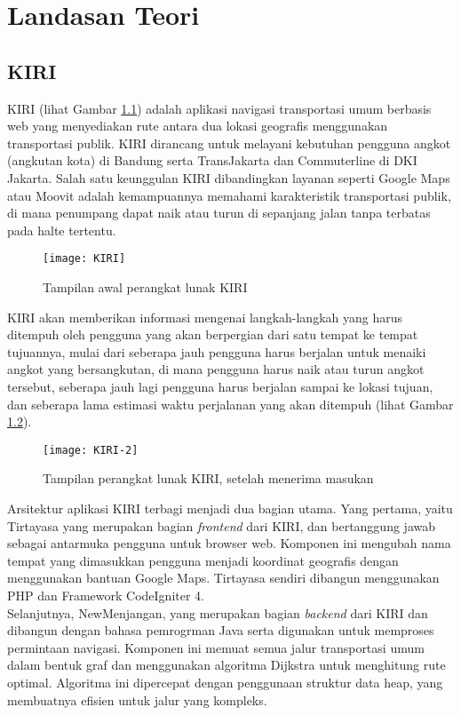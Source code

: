 \chapter{Landasan Teori}
\label{chap:teori}

\section{KIRI ~\cite{nugroho_natali:17:KIRI}}
\label{sec:kiri}
KIRI (lihat Gambar \ref{fig:tampilanawalkiri}) adalah aplikasi navigasi transportasi umum berbasis web yang menyediakan rute antara dua lokasi geografis menggunakan transportasi publik. KIRI dirancang untuk melayani kebutuhan pengguna angkot (angkutan kota) di Bandung serta TransJakarta dan Commuterline di DKI Jakarta. Salah satu keunggulan KIRI dibandingkan layanan seperti Google Maps atau Moovit adalah kemampuannya memahami karakteristik  transportasi publik, di mana penumpang dapat naik atau turun di sepanjang jalan tanpa terbatas pada halte tertentu.
\begin{figure}[H] 
	\centering  
	\texttt{[image: KIRI]}  
	\caption{Tampilan awal perangkat lunak KIRI}
	\label{fig:tampilanawalkiri} 
\end{figure}
\noindent
KIRI akan memberikan informasi mengenai langkah-langkah yang harus ditempuh oleh pengguna yang akan berpergian dari satu tempat ke tempat tujuannya, mulai dari seberapa jauh pengguna harus berjalan untuk menaiki angkot yang bersangkutan, di mana pengguna harus naik atau turun angkot tersebut, seberapa jauh lagi pengguna harus berjalan sampai ke lokasi tujuan, dan seberapa lama estimasi waktu perjalanan yang akan ditempuh (lihat Gambar \ref{fig:tampilankiri}).
\begin{figure}[H] 
	\centering  
	\texttt{[image: KIRI-2]}  
	\caption{Tampilan perangkat lunak KIRI, setelah menerima masukan}
	\label{fig:tampilankiri} 
\end{figure}
\noindent
Arsitektur aplikasi KIRI terbagi menjadi dua bagian utama. Yang pertama, yaitu Tirtayasa yang merupakan bagian \textit{frontend} dari KIRI, dan bertanggung jawab sebagai antarmuka pengguna untuk browser web. Komponen ini mengubah nama tempat yang dimasukkan pengguna menjadi koordinat geografis dengan menggunakan bantuan Google Maps. Tirtayasa sendiri dibangun menggunakan PHP dan Framework CodeIgniter 4.
\\
Selanjutnya, NewMenjangan, yang merupakan bagian \textit{backend} dari KIRI dan dibangun dengan bahasa pemrogrman Java serta digunakan untuk memproses permintaan navigasi. Komponen ini memuat semua jalur transportasi umum dalam bentuk graf dan menggunakan algoritma Dijkstra untuk menghitung rute optimal. Algoritma ini dipercepat dengan penggunaan struktur data heap, yang membuatnya efisien untuk jalur yang kompleks.

